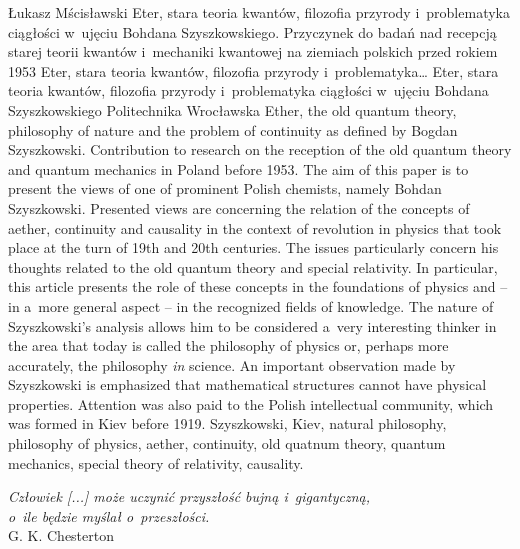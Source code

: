 \begin{artplenv}{Łukasz Mścisławski}
	{Eter, stara teoria kwantów, filozofia przyrody i~problematyka ciągłości w~ujęciu Bohdana Szyszkowskiego. Przyczynek do badań nad recepcją starej teorii kwantów i~mechaniki kwantowej na ziemiach polskich przed rokiem 1953}
	{Eter, stara teoria kwantów, filozofia przyrody i~problematyka\ldots}
	{Eter, stara teoria kwantów, filozofia przyrody i~problematyka ciągłości w~ujęciu Bohdana Szyszkowskiego}
	{Politechnika Wrocławska}
	{Ether, the old quantum theory, philosophy of nature and the problem of continuity as defined by Bogdan Szyszkowski. Contribution to research on the reception of the old quantum theory and quantum mechanics in Poland before 1953.}
	{The aim of this paper is to present the views of one of prominent Polish chemists, namely Bohdan Szyszkowski. Presented views are concerning the relation of the concepts of aether, continuity and causality in the context of revolution in physics that took place at the turn of 19th and 20th centuries. The issues particularly concern his thoughts related to the old quantum theory and special relativity. In particular, this article presents the role of these concepts in the foundations of physics and -- in a~more general aspect -- in the recognized fields of knowledge. The nature of Szyszkowski's analysis allows him to be considered a~very interesting thinker in the area that today is called the philosophy of physics or, perhaps more accurately, the philosophy \textit{in} science. An important observation made by Szyszkowski is emphasized that mathematical structures cannot have physical properties. Attention was also paid to the Polish intellectual community, which was formed in Kiev before 1919.}
	{Szyszkowski, Kiev, natural philosophy, philosophy of physics, aether, continuity, old quatnum theory, quantum mechanics, special theory of relativity, causality.}


\begin{flushright}
\textit{Człowiek [...] może uczynić przyszłość bujną i~gigantyczną,\\
o~ile będzie myślał o~przeszłości.\\}
G. K. Chesterton
\end{flushright}



\end{artplenv}
